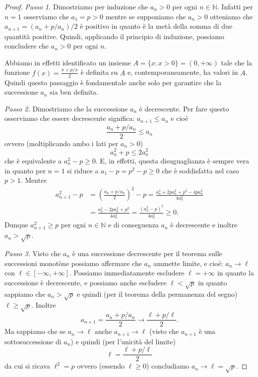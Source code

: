 \documentclass[italian,a4paper]{scrartcl}
\newcommand{\NN}{{\mathbb N}}
\begin{document}
\begin{proof}
\emph{Passo 1.} Dimostriamo per induzione che $a_n>0$ per ogni $n\in \NN$.
Infatti per $n=1$ osserviamo che $a_1=p>0$ mentre se supponiamo che
$a_n>0$ otteniamo che $a_{n+1} = (a_n + p/a_n)/2$ è positivo in quanto
è la metà della somma di due quantità positive. Quindi, applicando il
principio di induzione, possiamo concludere che $a_n>0$ per ogni $n$.

Abbiamo in effetti identificato un insieme $A=\{x\colon x>0\} = (0,
+\infty)$ tale che la funzione $f(x) = \frac{x + p/x}{2}$ è definita
su $A$ e, contemporaneamente, ha valori in $A$.
Quindi questo passaggio è fondamentale anche solo per
garantire che la successione $a_n$ sia ben definita.

\emph{Passo 2.} Dimostriamo che la successione $a_n$ è decrescente.
Per fare questo osserviamo che essere decrescente significa:
$ a_{n+1} \le a_n$
e cioé
\[
\frac{a_n + p/a_n}{2} \le a_n
\]
ovvero (moltiplicando ambo i lati per $a_n>0$)
\[
a_n^2 + p \le 2 a_n^2
\]
che è equivalente a $a_n^2 - p \ge 0$. E, in effetti, questa
disuguaglianza è sempre vera in quanto per $n=1$ si riduce a $a_1 - p
= p^2 - p \ge 0$ che è soddisfatta nel caso $p>1$. Mentre
\begin{align*}
a_{n+1}^2 - p & = \left(\frac{a_n+p/a_n}{2}\right)^2 - p
= \frac{a_n^4 + 2 p a_n^2 + p^2 - 4 p a_n^2}{4 a_n^2} \\
& = \frac{a_n^2 - 2 p a_n^2 + p^2}{4 a_n^2}
 = \frac{\left(a_n^2 - p\right)^2}{4a_n^2} \ge 0.
\end{align*}
Dunque $a_{n+1}^2 \ge p$ per ogni $n\in \NN$ e di conseguenza $a_n$ è
decrescente e inoltre $a_n > \sqrt p$.

\emph{Passo 3.}
Visto che $a_n$ è una successione decrescente
per il teorema sulle successioni monotòne possiamo
affermare che $a_n$ ammette limite, e cioé: $a_n \to \ell$ con $\ell
\in [-\infty, +\infty]$. Possiamo immediatamente escludere
$\ell=+\infty$ in quanto la successione è decrescente, e possiamo
anche escludere $\ell<\sqrt{p}$ in quanto sappiamo che $a_n > \sqrt{p}$ e quindi
(per il teorema della permanenza del segno) $\ell \ge \sqrt p$.
Inoltre
\[
  a_{n+1} = \frac{a_n + p/a_n}{2} \to \frac{\ell + p/\ell}{2}.
\]
Ma sappiamo che se $a_n\to \ell$ anche $a_{n+1}\to \ell$ (visto che
$a_{n+1}$ è una sottosuccessione di $a_n$) e quindi (per l'unicità del
limite)
\begin{equation}\label{ex_1_fixed}
  \ell = \frac{\ell + p/\ell}{2}
\end{equation}
da cui si ricava $\ell^2 = p$ ovvero (essendo $\ell\ge 0$) concludiamo
$a_n \to \ell =
\sqrt p$.
\end{proof}
\end{document}

